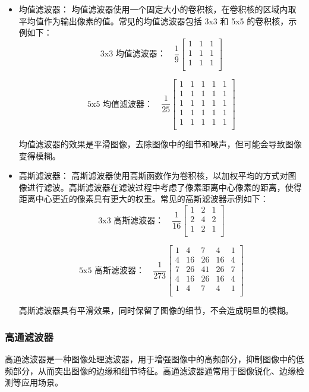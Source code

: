 \documentclass[a4paper,12pt]{article}
\begin{document}
\begin{itemize}
    \item 均值滤波器： 均值滤波器使用一个固定大小的卷积核，在卷积核的区域内取平均值作为输出像素的值。常见的均值滤波器包括 3x3 和 5x5 的卷积核，示例如下：
    \[
\text{3x3 均值滤波器：} \quad \frac{1}{9} \begin{bmatrix}
1 & 1 & 1 \\
1 & 1 & 1 \\
1 & 1 & 1 \\
\end{bmatrix}
\]

\[
\text{5x5 均值滤波器：} \quad \frac{1}{25} \begin{bmatrix}
1 & 1 & 1 & 1 & 1 \\
1 & 1 & 1 & 1 & 1 \\
1 & 1 & 1 & 1 & 1 \\
1 & 1 & 1 & 1 & 1 \\
1 & 1 & 1 & 1 & 1 \\
\end{bmatrix}
\]

均值滤波器的效果是平滑图像，去除图像中的细节和噪声，但可能会导致图像变得模糊。

    \item 高斯滤波器： 高斯滤波器使用高斯函数作为卷积核，以加权平均的方式对图像进行滤波。高斯滤波器在滤波过程中考虑了像素距离中心像素的距离，使得距离中心更近的像素具有更大的权重。常见的高斯滤波器示例如下：
\[
\text{3x3 高斯滤波器：} \quad \frac{1}{16} \begin{bmatrix}
1 & 2 & 1 \\
2 & 4 & 2 \\
1 & 2 & 1 \\
\end{bmatrix}
\]

\[
\text{5x5 高斯滤波器：} \quad \frac{1}{273} \begin{bmatrix}
1 & 4 & 7 & 4 & 1 \\
4 & 16 & 26 & 16 & 4 \\
7 & 26 & 41 & 26 & 7 \\
4 & 16 & 26 & 16 & 4 \\
1 & 4 & 7 & 4 & 1 \\
\end{bmatrix}
\]

高斯滤波器具有平滑效果，同时保留了图像的细节，不会造成明显的模糊。
    
\end{itemize}

\subsubsection{高通滤波器}
高通滤波器是一种图像处理滤波器，用于增强图像中的高频部分，抑制图像中的低频部分，从而突出图像的边缘和细节特征。高通滤波器通常用于图像锐化、边缘检测等应用场景。
\end{document}
